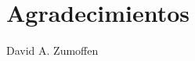 \chapter*{Agradecimientos}
\selectfont
\begin{flushright}
David A. Zumoffen
\end{flushright}
\sffamily

